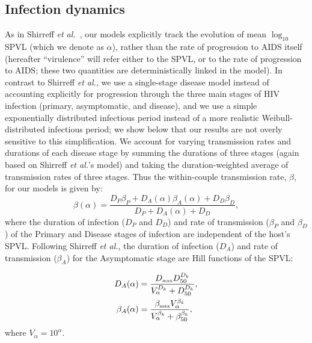 \documentclass[10pt,letterpaper]{article}
\newcommand{\etal}{\textit{et al.}}
\newcommand{\tsub}[2]{#1_{{\textrm{\tiny #2}}}}
\begin{document}
\subsection*{Infection dynamics}

As in Shirreff \etal\ \cite{shirreff_transmission_2011}, our models
explicitly track the evolution of mean $\log_{10}$ SPVL
(which we denote as $\alpha$), rather than the rate of progression to
AIDS itself (hereafter ``virulence'' will refer either to the SPVL, or
to the rate of progression to AIDS; these two quantities are
deterministically linked in the model).  
In contrast to Shirreff \etal, we use a
single-stage disease model instead of accounting explicitly for
progression through the three main stages of HIV infection (primary,
asymptomatic, and disease), and we use a simple exponentially
distributed infectious period instead of a more realistic
Weibull-distributed infectious period; we show below that our results
are not overly sensitive to this simplification. We account for
varying transmission rates and durations of each disease stage by
summing the durations of three stages (again based on Shirreff \etal's
model) and taking the duration-weighted average of transmission rates
of three stages. Thus the within-couple transmission rate, $\beta$,
for our models is given by:
\begin{equation}
\beta (\alpha) = \frac{D_P \beta_P + D_A (\alpha) \beta_A (\alpha) + D_D \beta_D}{D_P + D_A (\alpha) + D_D},
\end{equation}
where the duration of infection ($D_P$ and $D_D$) and rate of transmission ($\beta_P$ and $\beta_D$) of the Primary and Disease stages
of infection are independent of the host's SPVL. Following Shirreff \etal, the duration of infection ($D_A$) and rate of transmission ($\beta_A$) for the Asymptomatic stage are Hill functions of the SPVL:

\begin{equation}
\begin{split}
D_A(\alpha) &= \frac{\tsub{D}{max} D_{50} ^{D_k}}{V_\alpha ^{D_k} + D_{50}^{D_k}}, \\
\beta_A(\alpha) &= \frac{\tsub{\beta}{max} V_\alpha ^ {\beta_k}}%
{V_\alpha^{\beta_k} + \beta_{50} ^{\beta_k}},
\end{split}
\label{eq:hillfuns}
\end{equation}
where $V_{\alpha} = 10^\alpha$. 
\end{document}
